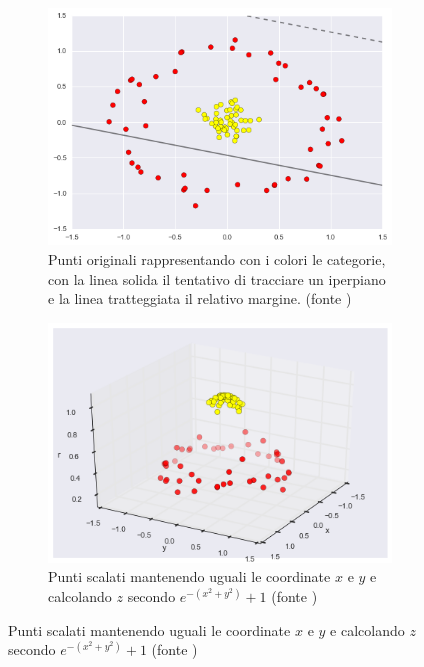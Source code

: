 \documentclass[a4paper,12pt]{report}
\begin{document}
\begin{figure}
	\caption{Esempio dati trasformati con funzione kernel}
	\begin{subfigure}[t]{0.5\textwidth}
		\includegraphics[width=0.9\linewidth]{Immagini/SVm non lineare.png}
		\captionsetup{width=.8\linewidth}
		\centering
		\caption{Punti originali rappresentando con i colori le categorie, con
		la linea solida il tentativo di tracciare un iperpiano e la linea
		tratteggiata il relativo margine. (fonte \cite{Data science handbook})} 
	\end{subfigure}
	\begin{subfigure}[t]{0.5\textwidth}
		\includegraphics[width=0.9\linewidth]{Immagini/SVM kernel.png}
		\captionsetup{width=.8\linewidth}
		\centering
		\caption{Punti scalati mantenendo uguali le coordinate $x$ e $y$ e
		calcolando $z$ secondo $e^{-(x^2 + y^2)} + 1$ (fonte \cite{Data science handbook})}
\end{subfigure}

	
\end{figure}
\end{document}
